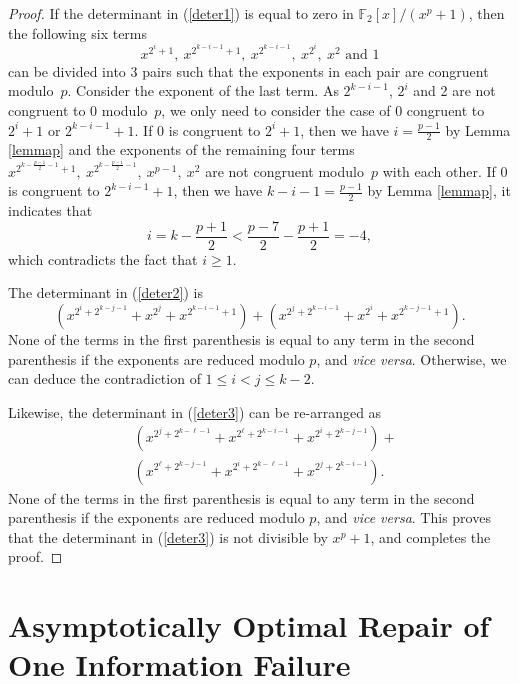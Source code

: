 \documentclass[conference]{IEEEtran}
\begin{document}
\begin{proof}
If the determinant in (\ref{deter1}) is equal to zero in $\mathbb{F}_2[x]/(x^p+1)$, then the following six terms
$$
 x^{2^i+1},\ x^{2^{k-i-1}+1},\
 x^{2^{k-i-1}},\ x^{2^i},\
 x^{2} \text{ and } 1
$$
can be divided into 3 pairs such that the exponents in  each pair are congruent modulo~$p$. Consider the exponent of the last term. As $2^{k-i-1}$, $2^i$ and 2 are not congruent to 0 modulo~$p$, we only need to consider the case of 0 congruent to $2^i+1$ or $2^{k-i-1}+1$.
If 0 is congruent to $2^i+1$, then we have $i=\frac{p-1}{2}$ by Lemma \ref{lemmap} and the exponents of the remaining four terms $x^{2^{k-\frac{p-1}{2}-1}+1},\ x^{2^{k-\frac{p-1}{2}-1}},\ x^{p-1},\ x^{2}$ are not congruent modulo~$p$ with each other. If 0 is congruent to $2^{k-i-1}+1$, then we have $k-i-1=\frac{p-1}{2}$ by Lemma \ref{lemmap}, it indicates that
$$i=k-\frac{p+1}{2}<\frac{p-7}{2}-\frac{p+1}{2}=-4,$$
which contradicts the fact that $i\geq 1$.

The determinant in (\ref{deter2}) is
$$
(x^{2^i+2^{k-j-1}}+x^{2^j}+x^{2^{k-i-1}+1})+(x^{2^j+2^{k-i-1}}+x^{2^i}+x^{2^{k-j-1}+1}).
$$
None of the terms in the first parenthesis is equal to any term in the second parenthesis if the exponents are reduced modulo $p$, and \emph{vice versa}. Otherwise, we can deduce the contradiction of $1\leq i<j\leq k-2$.

Likewise, the determinant in (\ref{deter3}) can be re-arranged as
\begin{align*}
&(x^{2^j+2^{k-\ell-1}}+x^{2^{\ell}+2^{k-i-1}}+x^{2^{i}+2^{k-j-1}})+\\
&(x^{2^{\ell}+2^{k-j-1}}+x^{2^{i}+2^{k-\ell-1}}+x^{2^{j}+2^{k-i-1}}).
\end{align*}
None of the terms in the first parenthesis is equal to any term in the second parenthesis if the exponents are reduced modulo $p$, and \emph{vice versa}.
This proves that the determinant in (\ref{deter3}) is not divisible by $x^p+1$, and completes the proof.

\end{proof}



\section{Asymptotically Optimal Repair of One Information Failure}
\label{sec:repair}
\end{document}
